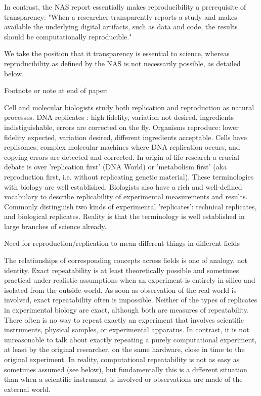 In contrast, the NAS report essentially makes reproducibility a prerequisite of transparency: "When a researcher transparently
	reports a study and makes available the underlying digital artifacts, such as data and code, the results should be 
	computationally reproducible."   

We take the position that it transparency is essential to science, whereas reproducibility as defined by the NAS is not necessarily possible, as detailed below.

Footnote or note at end of paper:

		Cell and molecular biologists study both replication and reproduction as natural processes.
		DNA replicates :  high fidelity, variation not desired, ingredients indistiguishable, errors are corrected on the fly.
		Organisms reproduce:  lower fidelity expected, variation desired, different ingredients acceptable.
		Cells have replisomes, complex molecular machines where DNA replication occurs, and copying errors are detected and corrected.
		In origin of life research a crucial debate is over 'replication first' (DNA World) or
 					'metabolism first' (aka reproduction first, i.e. without replicating genetic material).
		These terminologies with biology are well established.
		Biologists also have a rich and well-defined vocabulary to describe replicability of experimental measurements and results.
		Commonly distinguish two kinds of experimental 'replicates':  technical replicates, and biological replicates.
 			Reality is that the terminology is well established in large branches of science already.

	Need for reproduction/replication to mean different things in different fields

		The relationships of corresponding concepts across fields is one of analogy, not identity.
		Exact repeatability is at least theoretically possible and sometimes practical under realistic assumptions when an experiment
			is entirely in silico and isolated from the outside world.
		As soon as observation of the real world is involved, exact repeatability often is impossible.
		Neither of the types of replicates in experimental biology are exact, although both are measures of repeatability.
		There often is no way to repeat exactly an experiment that involves scientific instruments, physical samples, or experimental apparatus.
		In contrast, it is not unreasonable to talk about exactly repeating a purely computational experiment, at least by the original researcher,
			on the same hardware, close in time to the original experiment.
		In reality, computational repeatability is not as easy as sometimes assumed (see below), but fundamentally this is
			a different situation than when a scientific instrument is involved or observations are made of the external world.

